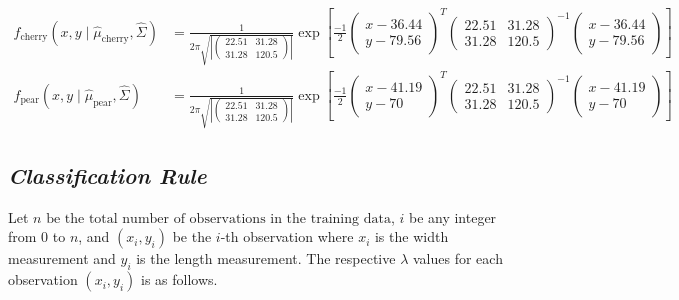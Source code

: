 \documentclass[]{article}
\begin{document}
\begin{align*}
f_{\text{cherry}}(x,y \mid \hat{\mu}_{\text{cherry}}, \hat{\Sigma}) &= 
\frac{1}{2\pi\sqrt{\left| \left( \begin{matrix}22.51 &31.28 \\ 31.28  & 120.5\end{matrix}\right) \right|}} 
\exp\left[\frac{-1}{2} 
\left(\begin{matrix}
x-36.44 \\ 
y-79.56
\end{matrix}\right)^T 
\left( \begin{matrix}22.51 &31.28 \\ 31.28  & 120.5\end{matrix}\right) ^{-1} 
\left(\begin{matrix}
x-36.44 \\ 
y-79.56 
\end{matrix}\right) \right] \\
f_{\text{pear}}(x,y \mid \hat{\mu}_{\text{pear}}, \hat{\Sigma}) &= 
\frac{1}{2\pi\sqrt{\left| \left( \begin{matrix}22.51 &31.28 \\ 31.28  & 120.5\end{matrix}\right) \right|}} 
\exp\left[\frac{-1}{2} 
\left(\begin{matrix}
x-41.19 \\ 
y-70
\end{matrix}\right)^T 
\left( \begin{matrix}22.51 &31.28 \\ 31.28  & 120.5\end{matrix}\right) ^{-1} 
\left(\begin{matrix}
x-41.19 \\ 
y-70 
\end{matrix}\right) \right]
\end{align*}

\subsection{\normalsize{\textit{Classification Rule}}}

Let
\(n \text{ be the total number of observations in the training data}\),
\(i\) be any integer from 0 to \(n\), and \((x_i, y_i)\) be the \(i\)-th
observation where \(x_i\) is the width measurement and \(y_i\) is the
length measurement. The respective \(\lambda\) values for each
observation \((x_i, y_i)\) is as follows.
\end{document}
